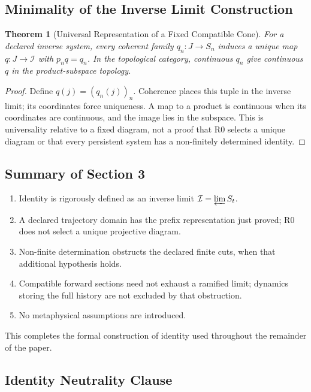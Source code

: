\documentclass[11pt,a4paper]{article}
\theoremstyle{plain}
\newtheorem{theorem}{Theorem}[section]
\theoremstyle{definition}
\theoremstyle{remark}
\begin{document}
\subsection{Minimality of the Inverse Limit Construction}

\begin{theorem}[Universal Representation of a Fixed Compatible Cone]\label{thm:minimal}
For a declared inverse system, every coherent family $q_n:J\to S_n$ induces a unique map $q:J\to\mathcal I$ with $p_nq=q_n$. In the topological category, continuous $q_n$ give continuous $q$ in the product-subspace topology.
\end{theorem}
\begin{proof}
Define $q(j)=(q_n(j))_n$. Coherence places this tuple in the inverse limit; its coordinates force uniqueness. A map to a product is continuous when its coordinates are continuous, and the image lies in the subspace. This is universality relative to a fixed diagram, not a proof that R0 selects a unique diagram or that every persistent system has a non-finitely determined identity.
\end{proof}

\subsection{Summary of Section 3}

\begin{enumerate}[leftmargin=*]
    \item Identity is rigorously defined as an inverse limit $\mathcal{I} = \varprojlim S_t$.
    \item A declared trajectory domain has the prefix representation just proved; R0 does not select a unique projective diagram.
    \item Non-finite determination obstructs the declared finite cuts, when that additional hypothesis holds.
    \item Compatible forward sections need not exhaust a ramified limit; dynamics storing the full history are not excluded by that obstruction.
    \item No metaphysical assumptions are introduced.
\end{enumerate}

This completes the formal construction of identity used throughout the remainder of the paper.

\subsection{Identity Neutrality Clause}
\end{document}
